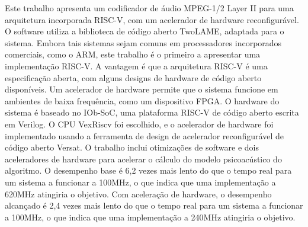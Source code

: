 \hspace{0.4cm} Este trabalho apresenta um codificador de áudio MPEG-1/2 Layer II para uma arquitetura incorporada RISC-V, com um acelerador de hardware reconfigurável. O software utiliza a biblioteca de código aberto TwoLAME, adaptada para o sistema. Embora tais sistemas sejam comuns em processadores incorporados comerciais, como o ARM, este trabalho é o primeiro a apresentar uma implementação RISC-V. A vantagem é que a arquitetura RISC-V é uma especificação aberta, com alguns designs de hardware de código aberto disponíveis. Um acelerador de hardware permite que o sistema funcione em ambientes de baixa frequência, como um dispositivo FPGA. O hardware do sistema é baseado no IOb-SoC, uma plataforma RISC-V de código aberto escrita em Verilog. O CPU VexRiscv foi escolhido, e o acelerador de hardware foi implementado usando a ferramenta de design de acelerador reconfigurável de código aberto Versat. O trabalho inclui otimizações de software e dois aceleradores de hardware para acelerar o cálculo do modelo psicoacústico do algoritmo. O desempenho base é 6,2 vezes mais lento do que o tempo real para um sistema a funcionar a 100MHz, o que indica que uma implementação a 620MHz atingiria o objetivo. Com aceleração de hardware, o desempenho alcançado é 2,4 vezes mais lento do que o tempo real para um sistema a funcionar a 100MHz, o que indica que uma implementação a 240MHz atingiria o objetivo.